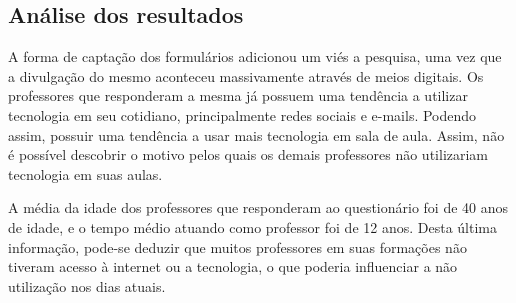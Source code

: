 
\subsection{Análise dos resultados}

A forma de captação dos formulários adicionou um viés a pesquisa, uma vez que a divulgação do mesmo aconteceu massivamente através de meios digitais.  Os professores que responderam a mesma já possuem uma tendência a utilizar tecnologia em seu cotidiano, principalmente redes sociais e e-mails. Podendo assim, possuir uma tendência a usar mais tecnologia em sala de aula. Assim, não é possível descobrir o motivo pelos quais os demais professores não utilizariam tecnologia em suas aulas.

A média da idade dos professores que responderam ao questionário foi de 40 anos de idade, e o tempo médio atuando como professor foi de 12 anos. Desta última informação, pode-se deduzir que muitos professores em suas formações não tiveram acesso à internet ou a tecnologia, o que poderia influenciar a não utilização nos dias atuais.


